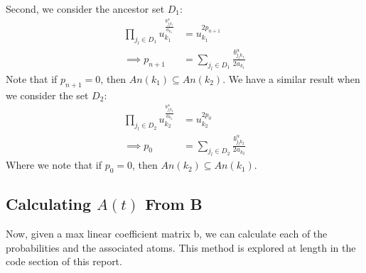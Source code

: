 \documentclass[12pt]{article}
\theoremstyle{definition}
\theoremstyle{definition}
\begin{document}
Second, we consider the ancestor set $D_1$:
\begin{align*}
    \prod_{j_l\in D_1 }u_{k_1}^{\frac{b_{j_lk_1}^\alpha}{a_{k_1}}} &=  u_{k_1}^{2p_{n+1}}\\
    \implies p_{n+1}&= \sum_{j_l \in D_1}\frac{b_{j_lk_1}^\alpha}{2a_{k_1}}
\end{align*}
Note that if $p_{n+1}=0$, then $An(k_1)\subseteq An(k_2)$. We have a similar result when we consider the set $D_2$:
\begin{align*}
    \prod_{j_l\in D_2 }u_{k_2}^{\frac{b_{j_lk_2}^\alpha}{a_{k_2}}} &=  u_{k_2}^{2p_{0}}\\
    \implies p_{0}&= \sum_{j_l \in D_2}\frac{b_{j_lk_2}^\alpha}{2a_{k_2}}
\end{align*}
Where we note that if $p_0=0$, then $An(k_2)\subseteq An(k_1)$.

\subsection{Calculating $A(t)$ From B}
Now, given a max linear coefficient matrix b, we can calculate each of the probabilities and the associated atoms. This method is explored at length in the code section of this report.
\end{document}
